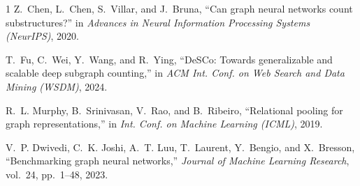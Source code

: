 \documentclass[conference]{IEEEtran}
\begin{document}
\begin{thebibliography}{1}
Z.~Chen, L.~Chen, S.~Villar, and J.~Bruna,
``Can graph neural networks count substructures?''
in \emph{Advances in Neural Information Processing Systems (NeurIPS)}, 2020.

T.~Fu, C.~Wei, Y.~Wang, and R.~Ying,
``DeSCo: Towards generalizable and scalable deep subgraph counting,''
in \emph{ACM Int. Conf. on Web Search and Data Mining (WSDM)}, 2024.

R.~L. Murphy, B.~Srinivasan, V.~Rao, and B.~Ribeiro,
``Relational pooling for graph representations,''
in \emph{Int. Conf. on Machine Learning (ICML)}, 2019.

V.~P. Dwivedi, C.~K. Joshi, A.~T. Luu, T.~Laurent, Y.~Bengio, and X.~Bresson,
``Benchmarking graph neural networks,''
\emph{Journal of Machine Learning Research}, vol.~24, pp.~1--48, 2023.


\end{thebibliography}
\end{document}
